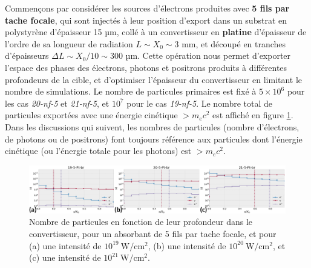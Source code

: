 \begin{refsection}

Commençons par considérer les sources d'électrons produites avec \textbf{5 fils par tache focale}, qui sont injectés à leur position d'export dans un substrat en polystyrène d'épaisseur 15 µm, collé à un convertisseur en \textbf{platine} d'épaisseur de l'ordre de sa longueur de radiation $L \sim X_0 \sim 3$ mm, et découpé en tranches d'épaisseurs $\Delta L \sim X_0/10 \sim 300$ µm. Cette opération nous permet d'exporter l'espace des phases des électrons, photons et positrons produits à différentes profondeurs de la cible, et d'optimiser l'épaisseur du convertisseur en limitant le nombre de simulations. Le nombre de particules primaires est fixé à $5 \times 10^6$ pour les cas \textit{20-nf-5} et \textit{21-nf-5}, et $10^7$ pour le cas \textit{19-nf-5}. Le nombre total de particules exportées avec une énergie cinétique $>m_e c^2$ est affiché en figure \ref{fig:63-nombre_particules_epaisseur}. Dans les discussions qui suivent, les nombres de particules (nombre d'électrons, de photons ou de positrons) font toujours référence aux particules dont l'énergie cinétique (ou l'énergie totale pour les photons) est $> m_e c^2$.

\begin{figure}[hbtp]
	\centering
	\includegraphics[width=\linewidth]{6-opti_numerique/nombre_particules_epaisseur.png}
    \caption{Nombre de particules en fonction de leur profondeur dans le convertisseur, pour un absorbant de 5 fils par tache focale, et pour (a) une intensité de $10^{19} ~ \si{\W \per \cm^2}$, (b) une intensité de $10^{20} ~ \si{\W \per \cm^2}$, et (c) une intensité de $10^{21} ~ \si{\W \per \cm^2}$.}
    \label{fig:63-nombre_particules_epaisseur}
\end{figure}


\end{refsection}

